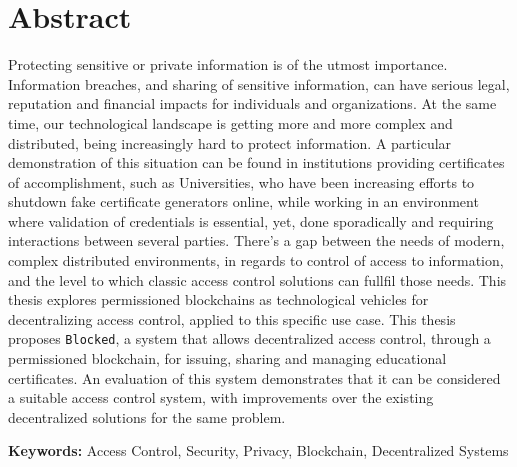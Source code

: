 \section*{Abstract}

Protecting sensitive or private information is of the utmost importance. Information breaches, and sharing of sensitive information, can have serious legal, reputation and financial impacts for individuals and organizations. At the same time, our technological landscape is getting more and more complex and distributed, being increasingly hard to protect information. A particular demonstration of this situation can be found in institutions providing certificates of accomplishment, such as Universities, who have been increasing efforts to shutdown fake certificate generators online, while working in an environment where validation of credentials is essential, yet, done sporadically and requiring interactions between several parties. There's a gap between the needs of modern, complex distributed environments, in regards to control of access to information, and the level to which classic access control solutions can fullfil those needs. This thesis explores permissioned blockchains as technological vehicles for decentralizing access control, applied to this specific use case. This thesis proposes \texttt{Blocked}, a system that allows decentralized access control, through a permissioned blockchain, for issuing, sharing and managing educational certificates. An evaluation of this system demonstrates that it can be considered a suitable access control system, with improvements over the existing decentralized solutions for the same problem.

\vfill

\noindent \textbf{Keywords:} Access Control, Security, Privacy, Blockchain, Decentralized Systems
